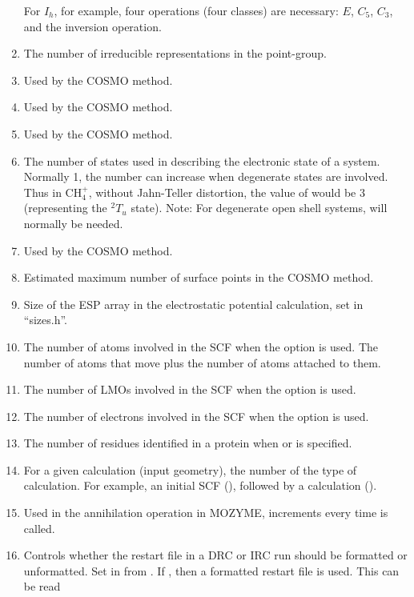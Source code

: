 \begin{enumerate}
For $I_h$, for example, four operations (four classes) are necessary: $E$,
$C_5$, $C_3$, and the inversion operation.
\item {} The number of irreducible representations in the point-group.
\item {} Used by the COSMO method.
\item {} Used by the COSMO method.
\item {} Used by the COSMO method.
\addtocounter{enumi}{1}
\item {} The number of states used in describing the electronic
state of a system.  Normally 1, the number can increase when degenerate
states are involved.  Thus in CH$_4^+$, without Jahn-Teller distortion,
the value of  would be 3 (representing the $^2T_u$ state).
Note: For degenerate open shell systems,  will normally be
needed.
\item {} Used by the COSMO method.
\addtocounter{enumi}{1}
\item {} Estimated maximum number of surface points in the
COSMO method.
\item {} Size of the ESP array in the electrostatic potential
calculation, set in  ``sizes.h''.
\item {} The number of atoms involved in the SCF when the 
option is used.  The number of atoms that move plus the number of atoms attached
to them.
\item {} The number of LMOs involved in the SCF when the 
option is used.
\item {} The number of electrons involved in the SCF when the
 option is used.
\item {} The number of residues identified in a protein when
 or  is specified.
\item {} For a given calculation (input geometry), the number
of the type of calculation.  For example, an initial SCF (),
followed by a  calculation ().
\addtocounter{enumi}{1}
\item {} Used in the annihilation operation in MOZYME, 
increments every time  is called.
\item {} Controls whether the restart file in a DRC or IRC run should
be formatted or unformatted.  Set in  from .
If , then a formatted restart file is used.  This can be read

\end{enumerate}
